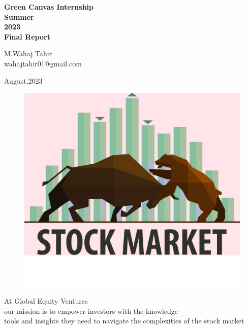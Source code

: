 \begin{Titlepage}
\begin{center}
    \vspace*{2cm}
    
    \textbf{\Huge Green Canvas Internship}\\
       \vspace{0.2cm}
    \textbf{\Huge Summer}\\
    
       \vspace{0.2cm}
    \textbf{\Huge 2023}\\
   
    \vspace*{2cm}
    \textbf{\Large Final Report}\\
    
      \vspace{0.2cm}
      \begin{center}
          \large M.Wahaj Tahir\\wahajtahir01@gmail.com
      \end{center} 
    
    \vspace{1cm}
    \begin{center}
    \large August,2023 
    \end{center}
    
    \vfill
    \vspace{0.8cm}
    \begin{figure}[hb]

        \centering
        \includegraphics[scale=0.30]{Logo/stocks.png}
    \end{figure}
     At Global Equity Ventures\\ our mission is to empower investors with the knowledge\\ tools and insights they need to navigate the complexities of the stock market
    \end{center}
   
\end{Titlepage}








